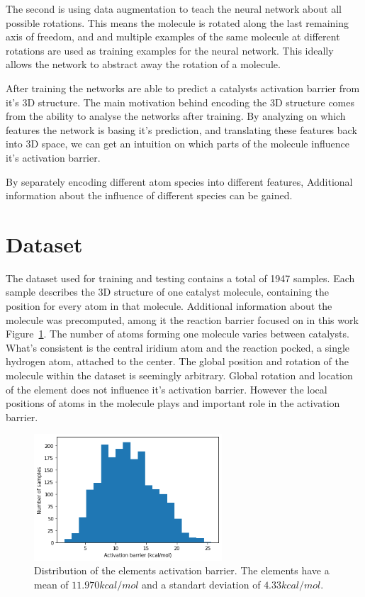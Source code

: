 The second is using data augmentation to teach the neural network about all possible rotations.
This means the molecule is rotated along the last remaining axis of freedom, and and multiple examples of the same molecule at different rotations are used as training examples for the neural network.
This ideally allows the network to abstract away the rotation of a molecule.

After training the networks are able to predict a catalysts activation barrier from it's 3D structure.
The main motivation behind encoding the 3D structure comes from the ability to analyse the networks after training.
By analyzing on which features the network is basing it's prediction, and translating these features back into 
3D space, we can get an intuition on which parts of the molecule influence it's activation barrier.

By separately encoding different atom species into different features, Additional information about the influence of different
species can be gained.

\section{Dataset}

The dataset used for training and testing contains a total of 1947 samples.
Each sample describes the 3D structure of one catalyst molecule, 
containing the position for every atom in that molecule.
Additional information about the molecule was precomputed, among it the reaction barrier focused on in this work Figure~\ref{fig:barriers}.
The number of atoms forming one molecule varies between catalysts.
What's consistent is the central iridium atom and the reaction pocked, a single hydrogen atom, attached to the center.
The global position and rotation of the molecule within the dataset is seemingly arbitrary.
Global rotation and location of the element does not influence it's activation barrier.
However the local positions of atoms in the molecule plays and important role in the activation barrier.

\begin{figure}
  \centering
  \includegraphics[width=7cm]{figures/introduction/barrier.png}
  \caption[Distribution of activation barriers]{Distribution of the elements activation barrier. The elements have a mean of $11.970 kcal/mol$ and a standart deviation of $4.33 kcal/mol$.}
  \label{fig:barriers}
\end{figure}


